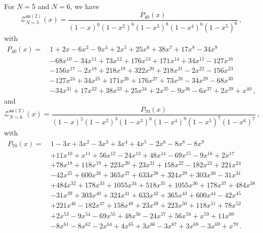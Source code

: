 \documentclass[a4paper,11pt]{article}
\begin{document}
For $N=5$ and $N=6$, we have \cite{dhokovic2007}
\begin{equation}
	\mathcal{Z}^{\mathfrak{su}(2)}_{N=5}(x) = \frac{P_{40}(x)}{(1-x)^{0}(1-x^2)^{6}(1-x^3)^{8}(1-x^4)^{6}(1-x^5)^{6}} \, ,
\end{equation}
with 
\begin{equation}
\begin{split}
	P_{40}(x)=\ &1+2x-6x^{3}-9x^{4}+2x^{5}+25x^{6}+38x^{7}+17x^{8}-34x^{9}\\&
	-68x^{10}-34x^{11}+73x^{12}+176x^{13}+171x^{14}+34x^{15}-127x^{16}\\&
	-156x^{17}-2x^{18}+218x^{19}+322x^{20}+218x^{21}-2x^{22}-156x^{23}\\&
	-127x^{24}+34x^{25}+171x^{26}+176x^{27}+73x^{28}-34x^{29}-68x^{30}\\&
	-34x^{31}+17x^{32}+38x^{33}+25x^{34}+2x^{35}-9x^{36}-6x^{37}+2x^{39}+x^{40} \, ,
\end{split}
\end{equation}
and
\begin{equation}
	\mathcal{Z}^{\mathfrak{su}(2)}_{N=6}(x) = \frac{P_{70}(x)}{(1-x)^5(1-x^2)^3(1-x^3)^6(1-x^4)^9(1-x^5)^7(1-x^6)^7} \ ,
\end{equation}
% 
with
% 
\begin{equation}
\begin{split}
	P_{70}(x)=\ &1-3x+3x^{2}-3x^{3}+3x^{4}+4x^{5}-2x^{6}-8x^{8}-8x^{9}\\&
	+11x^{10}+x^{11}+56x^{12}-24x^{13}+48x^{14}-69x^{15}-9x^{16}+2x^{17}\\&
	+78x^{18}+118x^{19}+223x^{20}+23x^{21}+158x^{22}-182x^{23}+221x^{24}\\&
	-42x^{25}+600x^{26}+365x^{27}+633x^{28}+324x^{29}+303x^{30}-31x^{31}\\&
	+484x^{32}+178x^{33}+1055x^{34}+518x^{35}+1055x^{36}+178x^{37}+484x^{38}\\&
	-31x^{39}+303x^{40}+324x^{41}+633x^{42}+365x^{43}+600x^{44}-42x^{45}\\&
	+221x^{46}-182x^{47}+158x^{48}+23x^{49}+223x^{50}+118x^{51}+78x^{52}\\&
	+2x^{53}-9x^{54}-69x^{55}+48x^{56}-24x^{57}+56x^{58}+x^{59}+11x^{60}\\&
	-8x^{61}-8x^{62}-2x^{64}+4x^{65}+3x^{66}-3x^{67}+3x^{68}-3x^{69}+x^{70} \, .
\end{split}
\end{equation}
\end{document}
